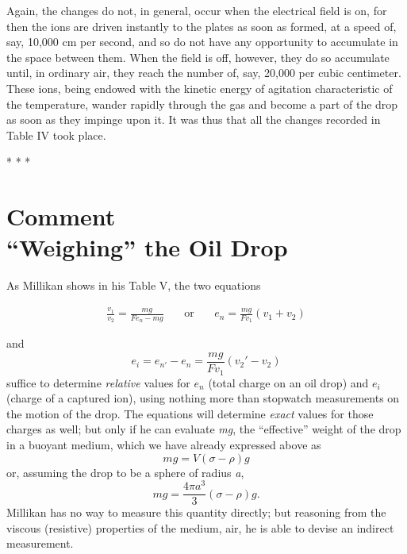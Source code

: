Again, the changes do not, in general, occur when the electrical field
is on, for then the ions are driven instantly to the plates as soon as
formed, at a speed of, say, 10,000 cm per second, and so do not have
any opportunity to accumulate in the space between them. When the field
is off, however, they do so accumulate until, in ordinary air, they
reach the number of, say, 20,000 per cubic centimeter. These ions, being
endowed with the kinetic energy of agitation characteristic of the
temperature, wander rapidly through the gas and become a part of the
drop as soon as they impinge upon it. It was thus that all the changes
recorded in Table IV took place.\\
\centerline{* * *}
%
\section*{Comment \\
  {\large``Weighing'' the Oil Drop}}

As Millikan shows in his Table V, the two equations
%
\begin{center}
\begin{align*}\tag{9}
\frac{v_1}{v_2} = \frac{mg}{Fe_n-mg} & \: & \text{or} & \: & e_n = \frac{mg}{Fv_1}(v_1+v_2)
\end{align*}
\end{center}
%
and
%
\begin{equation}\tag{10}
e_i = e_{n'}-e_n=\frac{mg}{Fv_1}(v_{2}'-v_2)
\end{equation}
%
suffice to determine \emph{relative} values for $e_n$ (total charge
on an oil drop) and $e_i$ (charge of a captured ion), using nothing
more than stopwatch measurements on the motion of the drop. The
equations will determine \emph{exact} values for those charges as well;
but only if he can evaluate \emph{mg}, the ``effective'' weight of the
drop in a buoyant medium, which we have already expressed above as
%
\begin{equation*}
mg = V(\sigma\!-\!\rho)g
\end{equation*}
%
or, assuming the drop to be a sphere of radius \emph{a},
%
\begin{equation*}\tag{3.6}
mg = \frac{4\pi{a}^3}{3}(\sigma\!-\!\rho)g.
\end{equation*}
%
Millikan has no way to measure this quantity directly; but reasoning
from the viscous (resistive) properties of the medium, air, he is able
to devise an indirect measurement.

